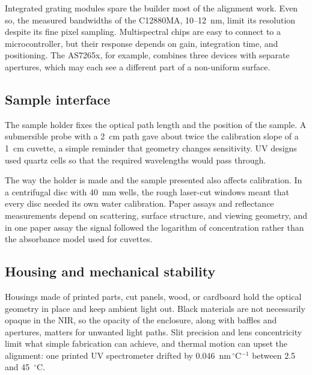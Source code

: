 Integrated grating modules spare the builder most of the alignment work. Even so, the measured bandwidths of the C12880MA, 10--12~nm, limit its resolution despite its fine pixel sampling.\citep{hotra2022investigation,jechow2024characterizing} Multispectral chips are easy to connect to a microcontroller, but their response depends on gain, integration time, and positioning.\citep{besozzi2026flexible,lopin2025evaluation} The AS7265x, for example, combines three devices with separate apertures, which may each see a different part of a non-uniform surface.\citep{lopin2025evaluation}

\subsection{Sample interface}

The sample holder fixes the optical path length and the position of the sample. A submersible probe with a 2~cm path gave about twice the calibration slope of a 1~cm cuvette, a simple reminder that geometry changes sensitivity.\citep{wang2015build} UV designs used quartz cells so that the required wavelengths would pass through.\citep{poh2021spectrophotometer,fernandes2024development}

The way the holder is made and the sample presented also affects calibration. In a centrifugal disc with 40~mm wells, the rough laser-cut windows meant that every disc needed its own water calibration.\citep{ogrady2021design} Paper assays and reflectance measurements depend on scattering, surface structure, and viewing geometry,\citep{arunraj2024design,sutherland2024synchronising} and in one paper assay the signal followed the logarithm of concentration rather than the absorbance model used for cuvettes.\citep{arunraj2024design}

\subsection{Housing and mechanical stability}

Housings made of printed parts, cut panels, wood, or cardboard hold the optical geometry in place and keep ambient light out.\citep{zhang2013open,feng2021open,kolesnichenko2023viking,ju2020fabrication} Black materials are not necessarily opaque in the NIR,\citep{troscianko2023osprad} so the opacity of the enclosure, along with baffles and apertures, matters for unwanted light paths.\citep{woo2018fabrication,davis2018open} Slit precision and lens concentricity limit what simple fabrication can achieve,\citep{feng2021open,tunens2024optical} and thermal motion can upset the alignment: one printed UV spectrometer drifted by 0.046~nm\,$^\circ$C$^{-1}$ between 2.5 and 45~$^\circ$C.\citep{wilkes2019pispec}

